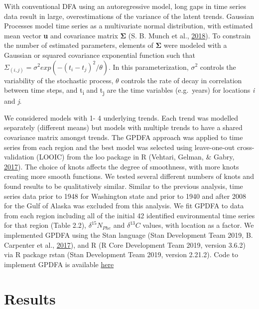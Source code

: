 \documentclass [11pt, proquest] {uwthesis}[2015/03/03]
\begin{document}
With conventional DFA using an autoregressive model, long gaps in time
series data result in large, overestimations of the variance of the
latent trends. Gaussian Processes model time series as a multivariate
normal distribution, with estimated mean vector \textbf{u} and
covariance matrix \textbf{Σ} (S. B. Munch et al.,
\protect\hyperlink{ref-Munch2018}{2018}). To constrain the number of
estimated parameters, elements of \textbf{Σ} were modeled with a
Gaussian or squared covariance exponential function such that
\(\Sigma_{(i,j)}= \sigma^2 exp(-(t_i-t_j )^2/\theta)\). In this
parameterization, \(\sigma^2\) controls the variability of the
stochastic process, \(\theta\) controls the rate of decay in correlation
between time steps, and t\textsubscript{i} and t\textsubscript{j} are
the time variables (e.g.~years) for locations \emph{i} and \emph{j}.

We considered models with 1- 4 underlying trends. Each trend was
modelled separately (different means) but models with multiple trends to
have a shared covariance matrix amongst trends. The GPDFA approach was
applied to time series from each region and the best model was selected
using leave-one-out cross-validation (LOOIC) from the loo package in R
(Vehtari, Gelman, \& Gabry, \protect\hyperlink{ref-Vehtari2017}{2017}).
The choice of knots affects the degree of smoothness, with more knots
creating more smooth functions. We tested several different numbers of
knots and found results to be qualitatively similar. Similar to the
previous analysis, time series data prior to 1948 for Washington state
and prior to 1940 and after 2008 for the Gulf of Alaska was excluded
from this analysis. We fit GPDFA to data from each region including all
of the initial 42 identified environmental time series for that region
(Table 2.2), \(\delta^{15}N_{Phe}\) and \(\delta^{13}C\) values, with
location as a factor. We implemented GPDFA using the Stan language (Stan
Development Team 2019, B. Carpenter et al.,
\protect\hyperlink{ref-Carpenter2017}{2017}), and R (R Core Development
Team 2019, version 3.6.2) via R package rstan (Stan Development Team
2019, version 2.21.2). Code to implement GPDFA is available
\href{https://github.com/mfeddern/CSIA-AA/blob/master/SourceData/Src/Analysis/gpdfa.stan}{here}

\section{Results}\label{results-1}
\end{document}
